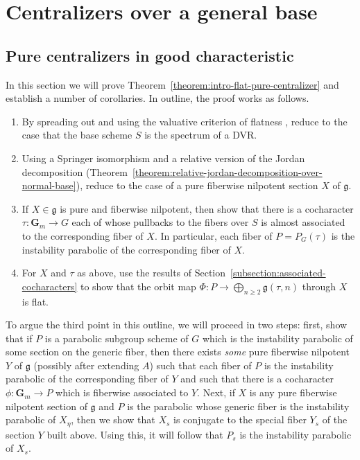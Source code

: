 \documentclass[11pt,reqno]{amsart}
\theoremstyle{definition}
\newcommand{\bG}{{\mathbf G}}
\newcommand{\fg}{\mathfrak{g}}
\begin{document}
\section{Centralizers over a general base}\label{section:general-centralizers}

\subsection{Pure centralizers in good characteristic}

In this section we will prove Theorem~\ref{theorem:intro-flat-pure-centralizer} and establish a number of corollaries. In outline, the proof works as follows.
\begin{enumerate}
    \item By spreading out and using the valuative criterion of flatness \cite[IV\textsubscript{3}, Thm.\ 11.8.1]{EGA}, reduce to the case that the base scheme $S$ is the spectrum of a DVR.
    \item Using a Springer isomorphism \cite[Thm.\ 5.1]{Integral-Springer} and a relative version of the Jordan decomposition (Theorem~\ref{theorem:relative-jordan-decomposition-over-normal-base}), reduce to the case of a pure fiberwise nilpotent section $X$ of $\fg$.
    \item If $X \in \fg$ is pure and fiberwise nilpotent, then show that there is a cocharacter $\tau: \bG_m \to G$ each of whose pullbacks to the fibers over $S$ is almost associated to the corresponding fiber of $X$. In particular, each fiber of $P = P_G(\tau)$ is the instability parabolic of the corresponding fiber of $X$.
    \item For $X$ and $\tau$ as above, use the results of Section~\ref{subsection:associated-cocharacters} to show that the orbit map $\Phi: P \to \bigoplus_{n \geq 2} \fg(\tau, n)$ through $X$ is flat.
\end{enumerate}

To argue the third point in this outline, we will proceed in two steps: first, show that if $P$ is a parabolic subgroup scheme of $G$ which is the instability parabolic of some section on the generic fiber, then there exists \textit{some} pure fiberwise nilpotent $Y$ of $\fg$ (possibly after extending $A$) such that each fiber of $P$ is the instability parabolic of the corresponding fiber of $Y$ and such that there is a cocharacter $\phi: \bG_m \to P$ which is fiberwise associated to $Y$. Next, if $X$ is any pure fiberwise nilpotent section of $\fg$ and $P$ is the parabolic whose generic fiber is the instability parabolic of $X_\eta$, then we show that $X_s$ is conjugate to the special fiber $Y_s$ of the section $Y$ built above. Using this, it will follow that $P_s$ is the instability parabolic of $X_s$. \smallskip
\end{document}
